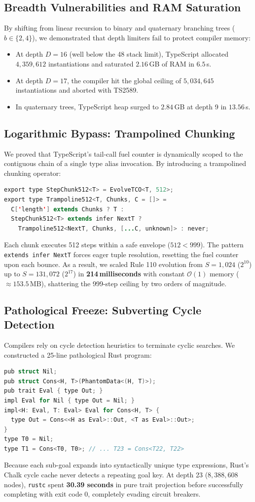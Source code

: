 \documentclass[10pt,journal,compsoc]{IEEEtran}
\begin{document}
\subsection{Breadth Vulnerabilities and RAM Saturation}
By shifting from linear recursion to binary and quaternary branching trees ($b \in \{2, 4\}$), we demonstrated that depth limiters fail to protect compiler memory:
\begin{itemize}
    \item At depth $D = 16$ (well below the 48 stack limit), TypeScript allocated $4,359,612$ instantiations and saturated $2.16$\,GB of RAM in $6.5$\,s.
    \item At depth $D = 17$, the compiler hit the global ceiling of $5,034,645$ instantiations and aborted with TS2589.
    \item In quaternary trees, TypeScript heap surged to $2.84$\,GB at depth 9 in $13.56$\,s.
\end{itemize}

\subsection{Logarithmic Bypass: Trampolined Chunking}
We proved that TypeScript's tail-call fuel counter is dynamically scoped to the contiguous chain of a single type alias invocation. By introducing a trampolined chunking operator:
\begin{lstlisting}[language=Java]
export type StepChunk512<T> = EvolveTCO<T, 512>;
export type Trampoline512<T, Chunks, C = []> =
  C['length'] extends Chunks ? T :
  StepChunk512<T> extends infer NextT ?
    Trampoline512<NextT, Chunks, [...C, unknown]> : never;
\end{lstlisting}
Each chunk executes 512 steps within a safe envelope ($512 < 999$). The pattern \texttt{extends infer NextT} forces eager tuple resolution, resetting the fuel counter upon each bounce.
As a result, we scaled Rule 110 evolution from $S = 1,024$ ($2^{10}$) up to $S = 131,072$ ($2^{17}$) in \textbf{214\,milliseconds} with constant $\mathcal{O}(1)$ memory ($\approx 153.5$\,MB), shattering the 999-step ceiling by two orders of magnitude.

\subsection{Pathological Freeze: Subverting Cycle Detection}
Compilers rely on cycle detection heuristics to terminate cyclic searches. We constructed a 25-line pathological Rust program:
\begin{lstlisting}[language=C]
pub struct Nil;
pub struct Cons<H, T>(PhantomData<(H, T)>);
pub trait Eval { type Out; }
impl Eval for Nil { type Out = Nil; }
impl<H: Eval, T: Eval> Eval for Cons<H, T> {
  type Out = Cons<<H as Eval>::Out, <T as Eval>::Out>;
}
type T0 = Nil;
type T1 = Cons<T0, T0>; // ... T23 = Cons<T22, T22>
\end{lstlisting}
Because each sub-goal expands into syntactically unique type expressions, Rust's Chalk cycle cache never detects a repeating goal key. At depth 23 ($8,388,608$ nodes), \texttt{rustc} spent \textbf{30.39 seconds} in pure trait projection before successfully completing with exit code 0, completely evading circuit breakers.
\end{document}
